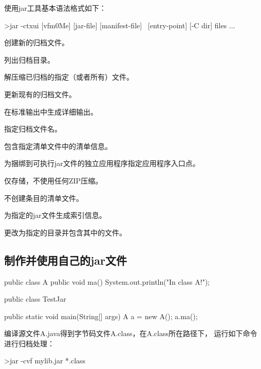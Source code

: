 使用jar工具基本语法格式如下：

\begin{shCode}
  >jar {-ctxui} [vfm0Me] [jar-file] [manifest-file] \  
  [entry-point] [-C dir] files ...
\end{shCode}


\begin{description}\kai
\item[-c] 创建新的归档文件。
\item[-t] 列出归档目录。
\item[-x] 解压缩已归档的指定（或者所有）文件。
\item[-u] 更新现有的归档文件。
\item[-v] 在标准输出中生成详细输出。
\item[-f] 指定归档文件名。
\item[-m] 包含指定清单文件中的清单信息。
\item[-e] 为捆绑到可执行jar文件的独立应用程序指定应用程序入口点。
\item[-0] 仅存储，不使用任何ZIP压缩。
\item[-M] 不创建条目的清单文件。
\item[-i] 为指定的jar文件生成索引信息。
\item[-C] 更改为指定的目录并包含其中的文件。
\end{description}

\subsection{制作并使用自己的jar文件}


\begin{javaCode}
  public class A {
    public void ma() {
      System.out.println("In class A!");
    }
  }  
\end{javaCode}


\begin{javaCode}
  public class TestJar {

    public static void main(String[] args) {
      A a = new A();
      a.ma();
    }
  }
\end{javaCode}

 编译源文件A.java得到字节码文件A.class，在A.class所在路径下，
运行如下命令进行归档处理：

\begin{shCode}
  >jar -cvf mylib.jar *.class  
\end{shCode}

